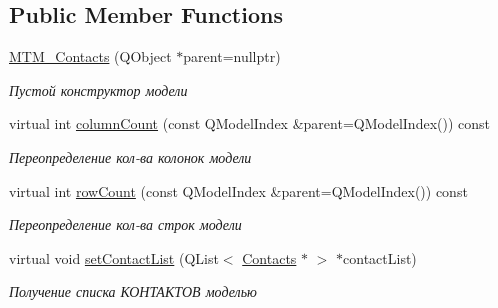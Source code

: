 \subsection*{Public Member Functions}
\begin{DoxyCompactItemize}
\item 
\mbox{\label{class_m_t_m___contacts_a0edd4288522dc199be883e7130bdf80c}} 
\mbox{\hyperlink{class_m_t_m___contacts_a0edd4288522dc199be883e7130bdf80c}{M\+T\+M\+\_\+\+Contacts}} (Q\+Object $\ast$parent=nullptr)
\begin{DoxyCompactList}\small\item\em Пустой конструктор модели \end{DoxyCompactList}\item 
\mbox{\label{class_m_t_m___contacts_a67863792a5f702954f7079c2b95c6540}} 
virtual int \mbox{\hyperlink{class_m_t_m___contacts_a67863792a5f702954f7079c2b95c6540}{column\+Count}} (const Q\+Model\+Index \&parent=Q\+Model\+Index()) const
\begin{DoxyCompactList}\small\item\em Переопределение кол-\/ва колонок модели \end{DoxyCompactList}\item 
\mbox{\label{class_m_t_m___contacts_aa6d1fbd13d5b1ce84f171bf9ca11dae2}} 
virtual int \mbox{\hyperlink{class_m_t_m___contacts_aa6d1fbd13d5b1ce84f171bf9ca11dae2}{row\+Count}} (const Q\+Model\+Index \&parent=Q\+Model\+Index()) const
\begin{DoxyCompactList}\small\item\em Переопределение кол-\/ва строк модели \end{DoxyCompactList}\item 
\mbox{\label{class_m_t_m___contacts_a0c20b611f8ee02a23db4ee98d6cc3101}} 
virtual void \mbox{\hyperlink{class_m_t_m___contacts_a0c20b611f8ee02a23db4ee98d6cc3101}{set\+Contact\+List}} (Q\+List$<$ \mbox{\hyperlink{class_contacts}{Contacts}} $\ast$ $>$ $\ast$contact\+List)
\begin{DoxyCompactList}\small\item\em Получение списка КОНТАКТОВ моделью \end{DoxyCompactList}\item 
\mbox{\label{class_m_t_m___contacts_a4c499bb4c0f63f2c12973859b2f70471}} 

\end{DoxyCompactItemize}
